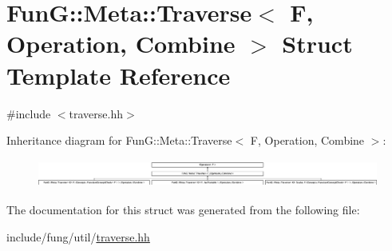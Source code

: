 \hypertarget{structFunG_1_1Meta_1_1Traverse}{}\section{FunG\+:\+:Meta\+:\+:Traverse$<$ F, Operation, Combine $>$ Struct Template Reference}
\label{structFunG_1_1Meta_1_1Traverse}


{\ttfamily \#include $<$traverse.\+hh$>$}

Inheritance diagram for FunG\+:\+:Meta\+:\+:Traverse$<$ F, Operation, Combine $>$\+:\begin{figure}[H]
\begin{center}
\leavevmode
\includegraphics[height=0.921053cm]{structFunG_1_1Meta_1_1Traverse}
\end{center}
\end{figure}


The documentation for this struct was generated from the following file\+:\begin{DoxyCompactItemize}
\item 
include/fung/util/\hyperlink{traverse_8hh}{traverse.\+hh}\end{DoxyCompactItemize}
